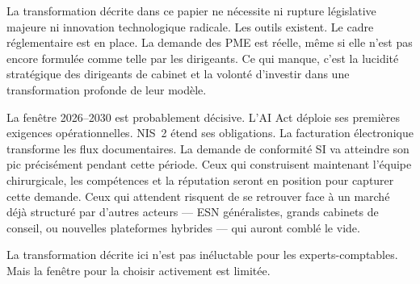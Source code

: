 \documentclass[12pt,a4paper]{article}
\begin{document}
La transformation décrite dans ce papier ne nécessite ni rupture législative majeure ni innovation technologique radicale. Les outils existent. Le cadre réglementaire est en place. La demande des PME est réelle, même si elle n'est pas encore formulée comme telle par les dirigeants. Ce qui manque, c'est la lucidité stratégique des dirigeants de cabinet et la volonté d'investir dans une transformation profonde de leur modèle.

La fenêtre 2026--2030 est probablement décisive. L'AI Act déploie ses premières exigences opérationnelles. NIS~2 étend ses obligations. La facturation électronique transforme les flux documentaires. La demande de conformité SI va atteindre son pic précisément pendant cette période. Ceux qui construisent maintenant l'équipe chirurgicale, les compétences et la réputation seront en position pour capturer cette demande. Ceux qui attendent risquent de se retrouver face à un marché déjà structuré par d'autres acteurs --- ESN généralistes, grands cabinets de conseil, ou nouvelles plateformes hybrides --- qui auront comblé le vide.

La transformation décrite ici n'est pas inéluctable pour les experts-comptables. Mais la fenêtre pour la choisir activement est limitée.

\printbibliography[title={Références}]
\end{document}
